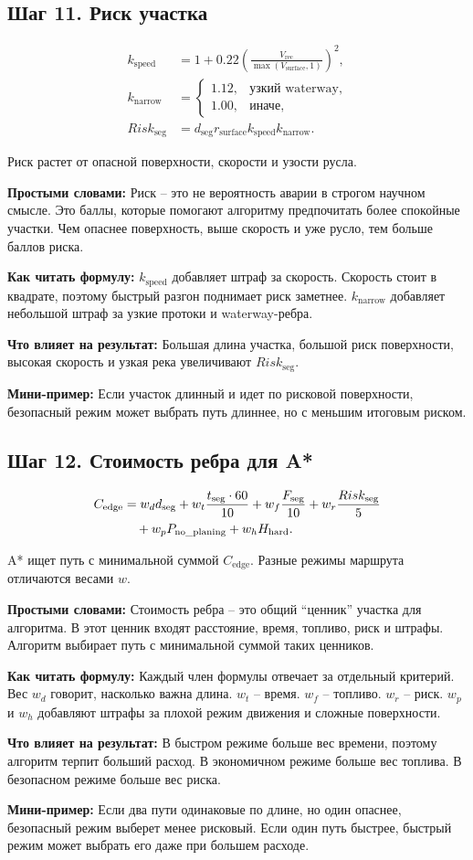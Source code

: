 \documentclass[12pt,a4paper]{article}
\newcommand{\simple}[1]{\par\smallskip\noindent\textbf{Простыми словами:} #1\par}
\newcommand{\howto}[1]{\par\smallskip\noindent\textbf{Как читать формулу:} #1\par}
\newcommand{\effect}[1]{\par\smallskip\noindent\textbf{Что влияет на результат:} #1\par}
\newcommand{\exampletext}[1]{\par\smallskip\noindent\textbf{Мини-пример:} #1\par}
\begin{document}
\subsection{Шаг 11. Риск участка}

\begin{align}
k_{\mathrm{speed}} &=
1 + 0.22\left(\frac{V_{\mathrm{rec}}}{\max(V_{\mathrm{surface}},1)}\right)^2, \\
k_{\mathrm{narrow}} &=
\begin{cases}
1.12, & \text{узкий waterway}, \\
1.00, & \text{иначе},
\end{cases} \\
Risk_{\mathrm{seg}} &=
d_{\mathrm{seg}} r_{\mathrm{surface}} k_{\mathrm{speed}} k_{\mathrm{narrow}}.
\end{align}

Риск растет от опасной поверхности, скорости и узости русла.

\simple{Риск -- это не вероятность аварии в строгом научном смысле. Это баллы,
которые помогают алгоритму предпочитать более спокойные участки. Чем опаснее
поверхность, выше скорость и уже русло, тем больше баллов риска.}
\howto{\(k_{\mathrm{speed}}\) добавляет штраф за скорость. Скорость стоит в
квадрате, поэтому быстрый разгон поднимает риск заметнее. \(k_{\mathrm{narrow}}\)
добавляет небольшой штраф за узкие протоки и waterway-ребра.}
\effect{Большая длина участка, большой риск поверхности, высокая скорость и
узкая река увеличивают \(Risk_{\mathrm{seg}}\).}
\exampletext{Если участок длинный и идет по рисковой поверхности, безопасный
режим может выбрать путь длиннее, но с меньшим итоговым риском.}

\subsection{Шаг 12. Стоимость ребра для A*}

\begin{align}
C_{\mathrm{edge}} &=
w_d d_{\mathrm{seg}}
+ w_t\frac{t_{\mathrm{seg}}\cdot60}{10}
+ w_f\frac{F_{\mathrm{seg}}}{10}
+ w_r\frac{Risk_{\mathrm{seg}}}{5} \notag \\
&\quad
+ w_pP_{\mathrm{no\_planing}}
+ w_hH_{\mathrm{hard}}.
\end{align}

A* ищет путь с минимальной суммой \(C_{\mathrm{edge}}\).
Разные режимы маршрута отличаются весами \(w\).

\simple{Стоимость ребра -- это общий ``ценник'' участка для алгоритма. В этот
ценник входят расстояние, время, топливо, риск и штрафы. Алгоритм выбирает путь
с минимальной суммой таких ценников.}
\howto{Каждый член формулы отвечает за отдельный критерий. Вес \(w_d\) говорит,
насколько важна длина. \(w_t\) -- время. \(w_f\) -- топливо. \(w_r\) -- риск.
\(w_p\) и \(w_h\) добавляют штрафы за плохой режим движения и сложные
поверхности.}
\effect{В быстром режиме больше вес времени, поэтому алгоритм терпит больший
расход. В экономичном режиме больше вес топлива. В безопасном режиме больше вес
риска.}
\exampletext{Если два пути одинаковые по длине, но один опаснее, безопасный
режим выберет менее рисковый. Если один путь быстрее, быстрый режим может
выбрать его даже при большем расходе.}
\end{document}
